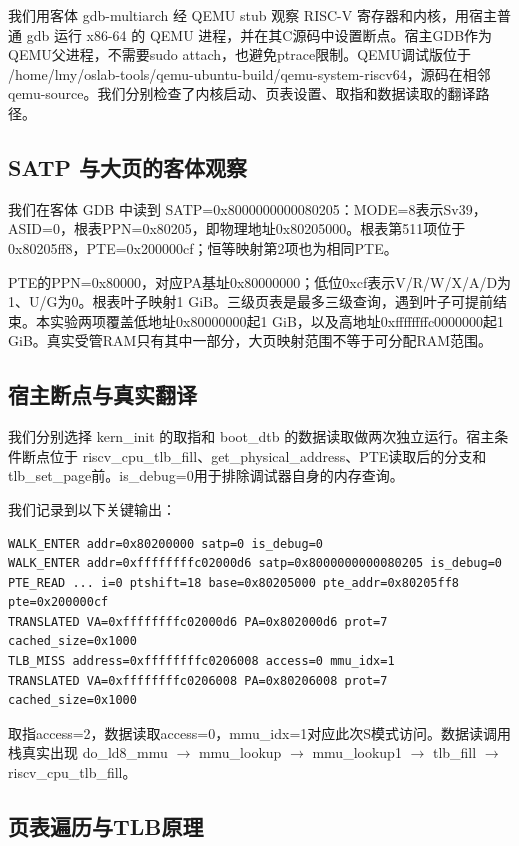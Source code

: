 \documentclass[UTF8,a4paper,10pt]{ctexart}
\begin{document}
我们用客体 gdb-multiarch 经 QEMU stub 观察 RISC-V 寄存器和内核，用宿主普通 gdb 运行 x86-64 的 QEMU 进程，并在其C源码中设置断点。宿主GDB作为QEMU父进程，不需要sudo attach，也避免ptrace限制。QEMU调试版位于 /home/lmy/oslab-tools/qemu-ubuntu-build/qemu-system-riscv64，源码在相邻qemu-source。我们分别检查了内核启动、页表设置、取指和数据读取的翻译路径。


\subsection{SATP 与大页的客体观察}

我们在客体 GDB 中读到 SATP=0x8000000000080205：MODE=8表示Sv39，ASID=0，根表PPN=0x80205，即物理地址0x80205000。根表第511项位于0x80205ff8，PTE=0x200000cf；恒等映射第2项也为相同PTE。


PTE的PPN=0x80000，对应PA基址0x80000000；低位0xcf表示V/R/W/X/A/D为1、U/G为0。根表叶子映射1 GiB。三级页表是最多三级查询，遇到叶子可提前结束。本实验两项覆盖低地址0x80000000起1 GiB，以及高地址0xffffffffc0000000起1 GiB。真实受管RAM只有其中一部分，大页映射范围不等于可分配RAM范围。


\subsection{宿主断点与真实翻译}

我们分别选择 kern\_init 的取指和 boot\_dtb 的数据读取做两次独立运行。宿主条件断点位于 riscv\_cpu\_tlb\_fill、get\_physical\_address、PTE读取后的分支和tlb\_set\_page前。is\_debug=0用于排除调试器自身的内存查询。


我们记录到以下关键输出：


\begin{lstlisting}
WALK_ENTER addr=0x80200000 satp=0 is_debug=0
WALK_ENTER addr=0xffffffffc02000d6 satp=0x8000000000080205 is_debug=0
PTE_READ ... i=0 ptshift=18 base=0x80205000 pte_addr=0x80205ff8 pte=0x200000cf
TRANSLATED VA=0xffffffffc02000d6 PA=0x802000d6 prot=7 cached_size=0x1000
TLB_MISS address=0xffffffffc0206008 access=0 mmu_idx=1
TRANSLATED VA=0xffffffffc0206008 PA=0x80206008 prot=7 cached_size=0x1000
\end{lstlisting}

取指access=2，数据读取access=0，mmu\_idx=1对应此次S模式访问。数据读调用栈真实出现 do\_ld8\_mmu \ensuremath{\rightarrow} mmu\_lookup \ensuremath{\rightarrow} mmu\_lookup1 \ensuremath{\rightarrow} tlb\_fill \ensuremath{\rightarrow} riscv\_cpu\_tlb\_fill。


\subsection{页表遍历与TLB原理}
\end{document}

